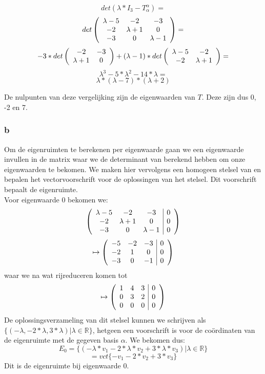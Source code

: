 \documentclass[lineaire_algebra_oplossingen.tex]{subfiles}
\begin{document}
\[det(\lambda * I_3 - T^\alpha_\alpha)=\]
\[det\left(
\begin{array}{c c c}
\lambda-5 & -2 & -3 \\
-2 & \lambda+1 & 0 \\
-3 & 0 & \lambda-1 \\
\end{array}
\right)=\]
\[-3*det\left(
\begin{array}{c c}
-2 & -3 \\
\lambda+1 & 0 \\
\end{array}
\right) + (\lambda-1)*det\left(
\begin{array}{c c}
\lambda-5 & -2 \\
-2 & \lambda+1 \\
\end{array}
\right)=\]
\[\lambda^3 - 5*\lambda^2 - 14*\lambda=\]
\[\lambda*(\lambda-7)*(\lambda+2)\]

De nulpunten van deze vergelijking zijn de eigenwaarden van $T$. Deze zijn dus 0, -2 en 7.

\subsubsection*{b}

Om de eigenruimten te berekenen per eigenwaarde gaan we een eigenwaarde invullen in de matrix waar we de determinant van berekend hebben om onze eigenwaarden te bekomen. We maken hier vervolgens een homogeen stelsel van en bepalen het vectorvoorschrift voor de oplossingen van het stelsel. Dit voorschrift bepaalt de eigenruimte.\\

Voor eigenwaarde 0 bekomen we:
\[\left(
\begin{array}{c c c | c}
\lambda-5 & -2 & -3 & 0\\
-2 & \lambda+1 & 0 & 0\\
-3 & 0 & \lambda-1 & 0\\
\end{array}
\right)\]
\[\mapsto\left(
\begin{array}{c c c | c}
-5 & -2 & -3 & 0 \\
-2 & 1 & 0 & 0\\
-3 & 0 & -1 & 0\\
\end{array}
\right)\]
waar we na wat rijreduceren komen tot
\[\mapsto\left(
\begin{array}{c c c | c}
1 & 4 & 3 & 0 \\
0 & 3 & 2 & 0\\
0 & 0 & 0 & 0\\
\end{array}
\right)\]
De oplossingsverzameling van dit stelsel kunnen we schrijven als $\{(-\lambda,-2*\lambda,3*\lambda)|\lambda\in\mathbb{R}\}$, hetgeen een voorschrift is voor de co\"ordinaten van de eigenruimte met de gegeven basis $\alpha$. We bekomen dus:
\[E_0 = \{(-\lambda*v_1-2*\lambda*v_2+3*\lambda*v_3)|\lambda\in\mathbb{R}\}\]
\[=vct\{-v_1-2*v_2+3*v_3\}\]
Dit is de eigenruimte bij eigenwaarde 0.
\end{document}
